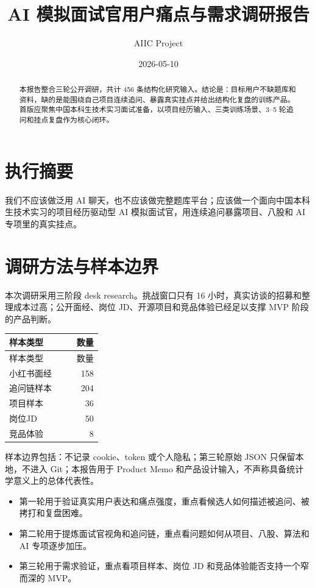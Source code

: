 \documentclass[UTF8,11pt]{ctexart}
\title{AI 模拟面试官用户痛点与需求调研报告}
\author{AIIC Project}
\date{2026-05-10}
\begin{document}
\maketitle

\begin{abstract}
本报告整合三轮公开调研，共计 456 条结构化研究输入。结论是：目标用户不缺题库和资料，缺的是能围绕自己项目连续追问、暴露真实挂点并给出结构化复盘的训练产品。首版应聚焦中国本科生技术实习面试准备，以项目经历输入、三类训练场景、3--5 轮追问和挂点复盘作为核心闭环。
\end{abstract}

\section{执行摘要}

我们不应该做泛用 AI 聊天，也不应该做完整题库平台；应该做一个面向中国本科生技术实习的项目经历驱动型 AI 模拟面试官，用连续追问暴露项目、八股和 AI 专项里的真实挂点。


\FloatBarrier

\section{调研方法与样本边界}

本次调研采用三阶段 desk research。挑战窗口只有 16 小时，真实访谈的招募和整理成本过高；公开面经、岗位 JD、开源项目和竞品体验已经足以支撑 MVP 阶段的产品判断。

\begin{longtable}{p{0.55\linewidth}r}
\toprule
样本类型 & 数量 \\
\midrule
\endfirsthead
\toprule
样本类型 & 数量 \\
\midrule
\endhead
小红书面经 & 158 \\
追问链样本 & 204 \\
项目样本 & 36 \\
岗位JD & 50 \\
竞品体验 & 8 \\
\bottomrule
\end{longtable}

样本边界包括：不记录 cookie、token 或个人隐私；第三轮原始 JSON 只保留本地，不进入 Git；本报告用于 Product Memo 和产品设计输入，不声称具备统计学意义上的总体代表性。
\begin{itemize}
\item 第一轮用于验证真实用户表达和痛点强度，重点看候选人如何描述被追问、被拷打和复盘困难。
\item 第二轮用于提炼面试官视角和追问链，重点看问题如何从项目、八股、算法和 AI 专项逐步加压。
\item 第三轮用于需求验证，重点看项目样本、岗位 JD 和竞品体验能否支持一个窄而深的 MVP。
\end{itemize}
\end{document}
